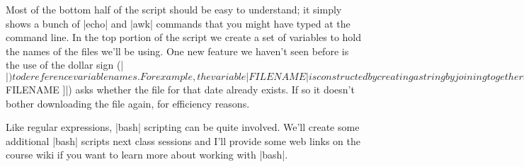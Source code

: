 Most of the bottom half of the script should be easy to understand; it simply shows a bunch of |echo| and |awk| commands that you might have typed at the command line. In the top portion of the script we create a set of variables to hold the names of the files we'll be using. One new feature we haven't seen before is the use of the dollar sign (|$|) to dereference variable names.  For example, the variable |FILENAME| is constructed by creating a string by joining together the strings held in the variables |TODAY| and |BASEFILE| (and separated by a dash |-|). Depending on the date on which the script is run it generates a different set of file names, as specified by the variables |TODAY|, |BASEFILE|, and |REPORT|.  The bottom half of the script is setup to generate the appropriate output given those changing variables. 

One other feature to take note of is the |if-then-fi| conditional statement. The portion in the square brackets (|[ ! -e $FILENAME ]|) asks whether the file for that date already exists. If so it doesn't bother downloading the file again, for efficiency reasons.

Like regular expressions, |bash| scripting can be quite involved. We'll create some additional |bash| scripts next class sessions and I'll provide some web links on the course wiki if you want to learn more about working with |bash|.


